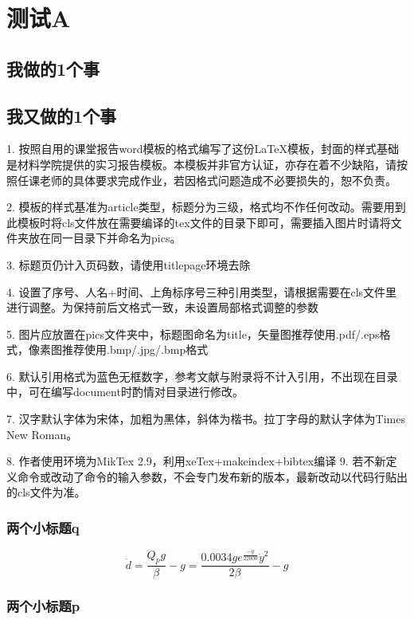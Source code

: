 \chapter{测试A}
\renewcommand\theequation{2-\arabic{equation}}
\blindtext
\section{我做的1个事}
\blindtext\cite{knuth1986the}\cite{lamport1989latex:}
\section{我又做的1个事}

1. 按照自用的课堂报告word模板的格式编写了这份LaTeX模板，封面的样式基础是材料学院提供的实习报告模板。本模板并非官方认证，亦存在着不少缺陷，请按照任课老师的具体要求完成作业，若因格式问题造成不必要损失的，恕不负责。

2. 模板的样式基准为article类型，标题分为三级，格式均不作任何改动。需要用到此模板时将cls文件放在需要编译的tex文件的目录下即可，需要插入图片时请将文件夹放在同一目录下并命名为pics。

3. 标题页仍计入页码数，请使用titlepage环境去除

4. 设置了序号、人名+时间、上角标序号三种引用类型，请根据需要在cls文件里进行调整。为保持前后文格式一致，未设置局部格式调整的参数

5. 图片应放置在pics文件夹中，标题图命名为title，矢量图推荐使用.pdf/.eps格式，像素图推荐使用.bmp/.jpg/.bmp格式

6. 默认引用格式为蓝色无框数字，参考文献与附录将不计入引用，不出现在目录中，可在编写document时酌情对目录进行修改。

7. 汉字默认字体为宋体，加粗为黑体，斜体为楷书。拉丁字母的默认字体为Times New Roman。

8. 作者使用环境为MikTex 2.9，利用xeTex+makeindex+bibtex编译
9. 若不新定义命令或改动了命令的输入参数，不会专门发布新的版本，最新改动以代码行贴出的cls文件为准。



\subsection{两个小标题q}

\begin{equation}
\ddot{d}=\frac{Q_{p}g}{\beta}-g=\frac{0.0034ge^{\frac{-y}{22000}} \dot{y}^{2}}{2\beta}-g \label{4}
\end{equation}

\subsection{两个小标题p}

